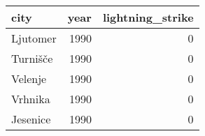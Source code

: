 \begin{tabular}{lrr}
\toprule
     city &  year &  lightning\_strike \\
\midrule
 Ljutomer &  1990 &                 0 \\
 Turnišče &  1990 &                 0 \\
  Velenje &  1990 &                 0 \\
  Vrhnika &  1990 &                 0 \\
 Jesenice &  1990 &                 0 \\
\bottomrule
\end{tabular}
